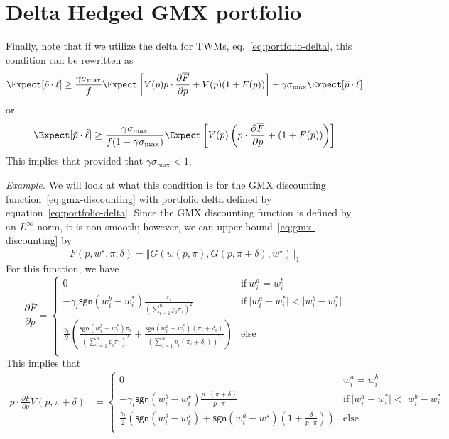 \section{Delta Hedged GMX portfolio}\label{app:gmx}
Finally, note that if we utilize the delta for TWMs, eq.~\eqref{eq:portfolio-delta}, this condition can be rewritten as
\[
\Expect[\tilde{p}\cdot\tilde{\ell}] \geq \frac{\gamma \sigma_{\max}}{f}\Expect\left[V(p) p\cdot \frac{\partial \overline{F}}{\partial p} + V(p)(1+F(p)) \right] + \gamma\sigma_{\max} \Expect[\tilde{p}\cdot\tilde{\ell}]
\]
or
\[
\Expect[\tilde{p}\cdot\tilde{\ell}] \geq \frac{\gamma \sigma_{\max}}{f(1-\gamma \sigma_{\max})}\Expect\left[V(p) \left(p\cdot \frac{\partial \overline{F}}{\partial p} + (1+F(p)) \right) \right] 
\]
This implies that provided that $\gamma \sigma_{\max} < 1$, 

\emph{Example.}
We will look at what this condition is for the GMX discounting function~\eqref{eq:gmx-discounting} with portfolio delta defined by equation~\eqref{eq:portfolio-delta}.
Since the GMX discounting function is defined by an $L^{\infty}$ norm, it is non-smooth; however, we can upper bound~\eqref{eq:gmx-discounting} by
\[
\overline{F}(p, w^{\star}, \pi, \delta) = \Vert G(w(p, \pi), G(p, \pi+\delta), w^{\star}) \Vert_1
\]
For this function, we have
\[
\frac{\partial \overline{F}}{\partial p} = 
\begin{cases}
0 & \mathrm{if}\ w^a_i = w^b_i\\ 
-\gamma_t\mathsf{sgn}(w^b_i - w^*_i) \frac{\pi_i}{\left(\sum_{i=1}^n p_i \pi_i\right)^2} & \mathrm{if}\ \vert w^a_i - w^*_i\vert < \vert w^b_i - w^*_i\vert \\
\frac{\gamma_t}{2}\left(\frac{\mathsf{sgn}(w^b_i - w^*_i) \pi_i}{\left(\sum_{i=1}^n p_i \pi_i\right)^2} + \frac{\mathsf{sgn}(w^a_i - w^*_i)(\pi_i + \delta_i)}{\left(\sum_{i=1}^n p_i (\pi_i+\delta_i)\right)^2}\right) & \mathrm{else}\\ 
\end{cases}
\]
This implies that
\begin{align*}
    p\cdot \frac{\partial \overline{F}}{\partial p} V(p, \pi+\delta) &= \begin{cases}
        0 & w_i^a = w_i^b \\ 
        -\gamma_t \mathsf{sgn}(w_i^b-w_i^{\star}) \frac{p\cdot(\pi+\delta)}{p\cdot \pi} &  \mathrm{if}\ \vert w^a_i - w^*_i\vert < \vert w^b_i - w^*_i\vert  \\
        \frac{\gamma_t}{2}\left(\mathsf{sgn}(w_i^b - w_i^{\star}) + \mathsf{sgn}(w_i^a-w^{\star})\left( 1 + \frac{\delta}{p\cdot \pi}\right) \right) & \mathrm{else} \\ 
    \end{cases}
\end{align*}
